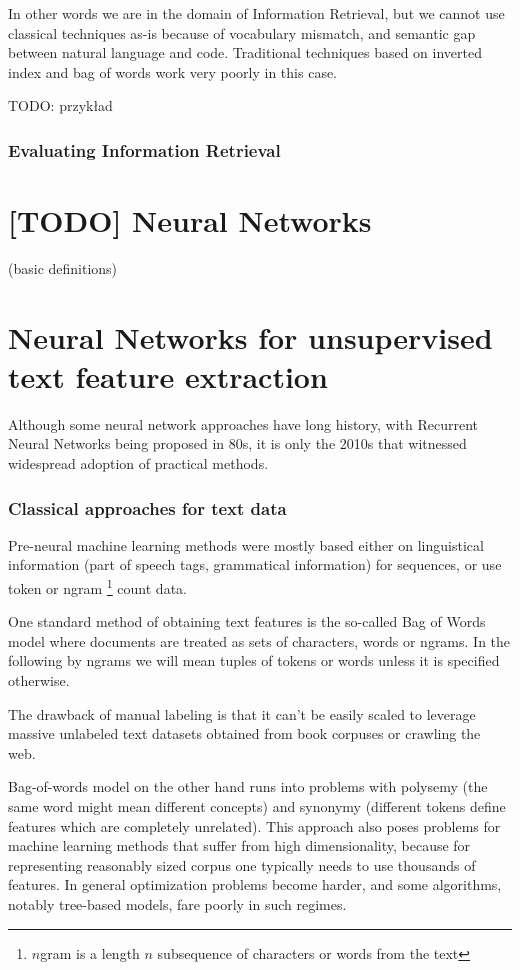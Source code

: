 \documentclass[11pt]{report}
\begin{document}
In other words we are in the domain of Information Retrieval, but we cannot use classical techniques as-is because of vocabulary mismatch, and semantic gap between natural language and code. Traditional techniques based on inverted index and bag of words work very poorly in this case.

TODO: przykład

\subsubsection{Evaluating Information Retrieval}

\section{[TODO] Neural Networks}


(basic definitions)

\section{Neural Networks for unsupervised text feature extraction}


Although some neural network approaches have long history, with Recurrent Neural Networks being proposed in 80s, it is only the 2010s that witnessed widespread adoption of practical methods. 

\subsubsection{Classical approaches for text data}


Pre-neural machine learning methods were mostly based either on linguistical information (part of speech tags, grammatical information) for sequences,
or use token or ngram \footnote{$n$gram is a length $n$ subsequence of characters or words from the text} count data.

One standard method of obtaining text features is the so-called Bag of Words model where documents are treated as sets of characters, words or ngrams. In the following by ngrams we will mean tuples of tokens or words unless it is specified otherwise.

The drawback of manual labeling is that it can't be easily scaled to leverage massive unlabeled text datasets obtained from book corpuses or crawling the web.

Bag-of-words model on the other hand runs into problems with polysemy (the same word might mean different concepts) and synonymy (different tokens define features which are completely unrelated).
This approach also poses problems for machine learning methods that suffer from high dimensionality, because for representing reasonably sized corpus one typically needs to use thousands of features.
In general optimization problems become harder, and some algorithms, notably tree-based models, fare poorly in such regimes. 
\end{document}
